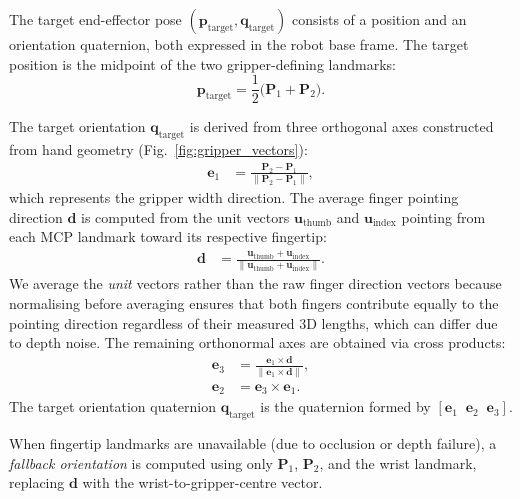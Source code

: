 \documentclass{ieeeaccess}
\newcommand{\vect}[1]{\mathbf{#1}}
\begin{document}
The target end-effector pose $(\vect{p}_{\text{target}},
\vect{q}_{\text{target}})$ consists of a position and an orientation
quaternion, both expressed in the robot base frame. The target position
is the midpoint of the two gripper-defining landmarks:
\begin{equation}\label{eq:targetpos}
  \vect{p}_{\text{target}} = \frac{1}{2}
    \bigl(\vect{P}_1 + \vect{P}_2\bigr).
\end{equation}

The target orientation $\vect{q}_{\text{target}}$ is derived from
three orthogonal axes constructed from hand geometry
(Fig.~\ref{fig:gripper_vectors}):
\begin{align}
  \vect{e}_1 &= \frac{\vect{P}_2 - \vect{P}_1}
    {\|\vect{P}_2 - \vect{P}_1\|},
    \label{eq:e1}
\end{align}
which represents the gripper width direction. The average finger
pointing direction $\vect{d}$ is computed from the unit vectors
$\vect{u}_{\text{thumb}}$ and $\vect{u}_{\text{index}}$ pointing from
each MCP landmark toward its respective fingertip:
\begin{align}
  \vect{d} &= \frac{\vect{u}_{\text{thumb}} +
    \vect{u}_{\text{index}}}
    {\|\vect{u}_{\text{thumb}} + \vect{u}_{\text{index}}\|}.
    \label{eq:davg}
\end{align}
We average the \emph{unit} vectors rather than the raw finger
direction vectors because normalising before averaging ensures that
both fingers contribute equally to the pointing direction regardless
of their measured 3D lengths, which can differ due to depth noise.
The remaining orthonormal axes are obtained via cross products:
\begin{align}
  \vect{e}_3 &= \frac{\vect{e}_1 \times \vect{d}}
    {\|\vect{e}_1 \times \vect{d}\|}, \label{eq:e3} \\
  \vect{e}_2 &= \vect{e}_3 \times \vect{e}_1. \label{eq:e2}
\end{align}
The target orientation quaternion $\vect{q}_{\text{target}}$ is the
quaternion formed by $[\vect{e}_1 \;\; \vect{e}_2 \;\; \vect{e}_3]$.

When fingertip landmarks are unavailable (due to occlusion or depth
failure), a \emph{fallback orientation} is computed using only
$\vect{P}_1$, $\vect{P}_2$, and the wrist landmark, replacing
$\vect{d}$ with the wrist-to-gripper-centre vector.
\end{document}
